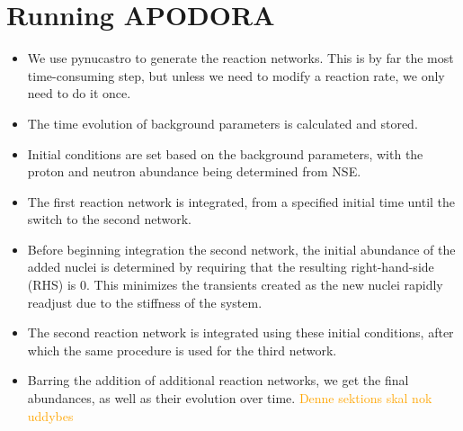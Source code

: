 \section{Running APODORA}
\label{sec:structure}

\begin{itemize}
    \item We use pynucastro to generate the reaction networks. This is by far the most time-consuming step, but unless we need to modify a reaction rate, we only need to do it once.
    \item The time evolution of background parameters is calculated and stored.
    \item Initial conditions are set based on the background parameters, with the proton and neutron abundance being determined from NSE.
    \item The first reaction network is integrated, from a specified initial time until the switch to the second network. 
    \item Before beginning integration the second network, the initial abundance of the added nuclei is determined by requiring that the resulting right-hand-side (RHS) is 0. This minimizes the transients created as the new nuclei rapidly readjust due to the stiffness of the system.
    \item The second reaction network is integrated using these initial conditions, after which the same procedure is used for the third network.
    \item Barring the addition of additional reaction networks, we get the final abundances, as well as their evolution over time. \textcolor{orange}{Denne sektions skal nok uddybes}
\end{itemize}

